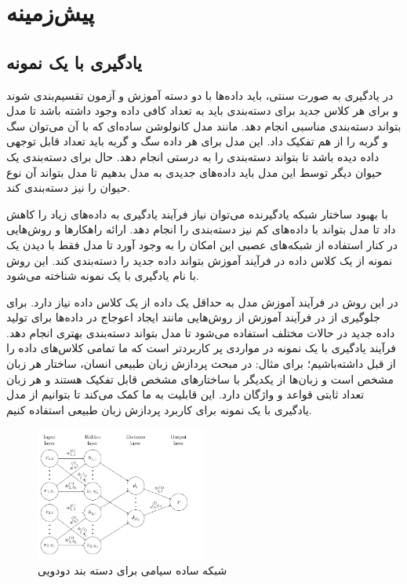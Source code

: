 \chapter{پیش‌زمینه}
\label{chap:two}


\section{یادگیری با یک نمونه}
در یادگیری به صورت سنتی، باید داده‌ها با دو دسته آموزش و آزمون تقسیم‌بندی شوند و برای هر کلاس جدید برای دسته‌بندی باید به تعداد کافی داده وجود داشته باشد تا مدل بتواند دسته‌بندی مناسبی انجام دهد. مانند مدل کانولوشن ساده‌ای که با آن می‌توان سگ و گربه را از هم تفکیک داد. این مدل برای هر داده سگ و گربه باید تعداد قابل توجهی داده دیده باشد تا بتواند دسته‌بندی را به درستی انجام دهد. حال برای دسته‌بندی یک حیوان دیگر توسط این مدل باید داده‌های جدیدی به مدل بدهیم تا مدل بتواند آن نوع حیوان را نیز دسته‌‌بندی کند.

با بهبود ساختار شبکه یادگیرنده می‌توان نیاز فرآیند یادگیری به داده‌های زیاد را کاهش داد تا مدل بتواند با داده‌های کم نیز دسته‌بندی را انجام دهد. ارائه راهکار‌ها و روش‌هایی در کنار استفاده از شبکه‌های عصبی این امکان را به وجود آورد تا مدل فقط با دیدن یک نمونه از یک کلاس داده در فرآیند آموزش بتواند داده جدید را دسته‌بندی کند. این روش با نام یادگیری با یک نمونه شناخته می‌شود.

در این روش در فرآیند آموزش مدل به حداقل یک داده از یک کلاس داده نیاز دارد. برای جلوگیری از
در فرآیند آموزش از روش‌هایی مانند ایجاد اعوجاج در داده‌ها برای تولید داده جدید در حالات مختلف استفاده می‌شود تا مدل بتواند دسته‌بندی بهتری انجام دهد. فرآیند یادگیری با یک نمونه در مواردی پر کاربردتر است که ما تمامی کلاس‌های داده را از قبل داشته‌باشیم؛ برای مثال: در مبحث پردازش زبان طبیعی انسان، ساختار هر زبان مشخص است و زبان‌ها از یکدیگر با ساختار‌های مشخص قابل تفکیک هستند و هر زبان تعداد ثابتی قواعد و واژگان دارد. این قابلیت به ما کمک می‌کند تا بتوانیم از مدل یادگیری با یک نمونه برای کاربرد پردازش زبان طبیعی استفاده کنیم.

\begin{figure}[h]
    \centering
    \includegraphics[width=0.5\textwidth]{img/report/simple_binary_classification_siamese}
    \caption{شبکه ساده سیامی برای دسته بند دودویی\cite{Koch}}
    \label{fig:simple-binarry-siamese}
    \centering
\end{figure}

